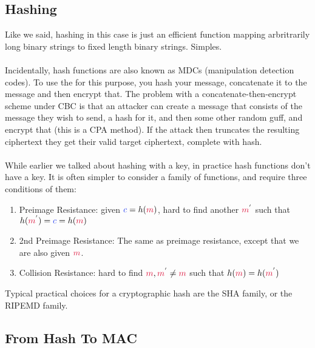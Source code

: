     \subsection{Hashing}
    Like we said, hashing in this case is just an efficient function mapping arbritrarily long binary strings to fixed length binary strings. Simples.\\
    \\
    Incidentally, hash functions are also known as MDCs (manipulation detection codes). To use the for this purpose, you hash your message, concatenate it to the message and then encrypt that. The problem with a concatenate-then-encrypt scheme under CBC is that an attacker can create a message that consists of the message they wish to send, a hash for it, and then some other random guff, and encrypt that (this is a CPA method). If the attack then truncates the resulting ciphertext they get their valid target ciphertext, complete with hash.\\
    \\
    While earlier we talked about hashing with a key, in practice hash functions don't have a key. It is often simpler to consider a family of functions, and require three conditions of them:
    \begin{enumerate}
        \item Preimage Resistance: given $\cc = h(\cm)$, hard to find another $\cm^{'}$ such that $h(\cm^{'}) = \cc = h(\cm)$
        \item 2nd Preimage Resistance: The same as preimage resistance, except that we are also given $\cm$.
        \item Collision Resistance: hard to find $\cm, \cm^{'} \neq \cm$ such that $h(\cm) = h(\cm^{'})$
    \end{enumerate}
    Typical practical choices for a cryptographic hash are the SHA family, or the RIPEMD family. %

    \subsection{From Hash To MAC}

